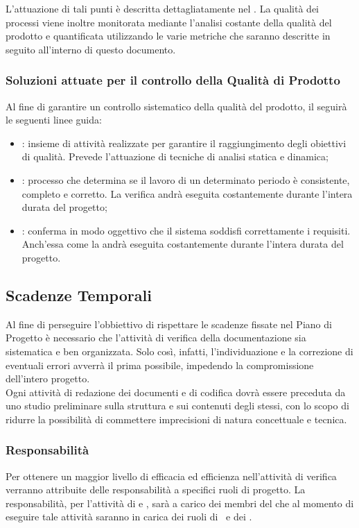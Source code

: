L'attuazione di tali punti è descritta dettagliatamente nel \PdP.
La qualità dei processi viene inoltre monitorata mediante l'analisi costante della qualità del prodotto e quantificata utilizzando le varie metriche che saranno descritte in seguito all'interno di questo documento.

\subsubsection{Soluzioni attuate per il controllo della Qualità di Prodotto}

Al fine di garantire un controllo sistematico della qualità del prodotto, il  seguirà le seguenti linee guida:
\begin{itemize}
\item
\textbf{}: insieme di attività realizzate per garantire il raggiungimento degli obiettivi di qualità. Prevede l'attuazione di tecniche di analisi statica e dinamica;
\item
\textbf{}: processo che determina se il lavoro di un determinato periodo è consistente, completo e corretto. La verifica andrà eseguita costantemente durante l'intera durata del progetto;
\item
\textbf{}: conferma in modo oggettivo che il sistema soddisfi correttamente i requisiti. \\ Anch'essa come la  andrà eseguita costantemente durante l'intera durata del progetto.
\end{itemize}

\subsection{Scadenze Temporali}
Al fine di perseguire l'obbiettivo di rispettare le scadenze fissate nel Piano di Progetto è necessario che l'attività di verifica della documentazione sia sistematica e ben organizzata. Solo così, infatti, l'individuazione e la correzione di eventuali errori avverrà il prima possibile, impedendo la compromissione dell'intero progetto. \\
Ogni attività di redazione dei documenti e di codifica dovrà essere preceduta da uno studio preliminare sulla struttura e sui contenuti degli stessi, con lo scopo di ridurre la possibilità di commettere imprecisioni di natura concettuale e tecnica.

\subsubsection{Responsabilità}

Per ottenere un maggior livello di efficacia ed efficienza nell'attività di verifica verranno attribuite delle responsabilità a specifici ruoli di progetto.
La responsabilità, per l'attività di  e , sarà a carico dei membri del  che al momento di eseguire tale attività saranno in carica dei ruoli di \Pm\ e dei \VerP.

\newpage